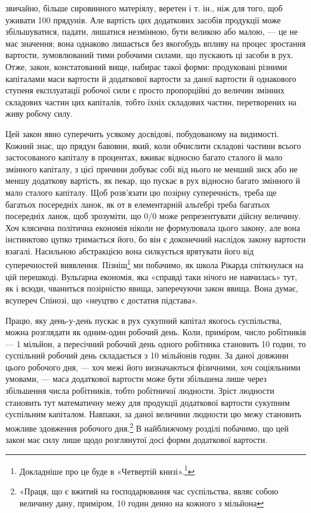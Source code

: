 \parcont{}  %
звичайно, більше сировинного матеріялу, веретен і т. ін., ніж
для того, щоб уживати 100 прядунів. Але вартість цих додаткових
засобів продукції може збільшуватися, падати, лишатися незмінною,
бути великою або малою, — це не має значення; вона однаково
лишається без якогобудь впливу на процес зростання вартости,
зумовлюваний тими робочими силами, що пускають ці
засоби в рух. Отже, закон, констатований вище, набирає такої
форми: продуковані різними капіталами маси вартости й додаткової
вартости за даної вартости й однакового ступеня експлуатації
робочої сили є просто пропорційні до величин змінних складових
частин цих капіталів, тобто їхніх складових частин, перетворених
на живу робочу силу.

Цей закон явно суперечить усякому досвідові, побудованому
на видимості. Кожний знає, що прядун бавовни, який, коли
обчислити складові частини всього застосованого капіталу в процентах,
вживає відносно багато сталого й мало змінного капіталу,
з цієї причини добуває собі від нього не менший зиск або не меншу
додаткову вартість, як пекар, що пускає в рух відносно багато
змінного й мало сталого капіталу. Щоб розв’язати цю позірну
суперечність, треба ще багатьох посередніх ланок, як от в елементарній
альґебрі треба багатьох посередніх ланок, щоб зрозуміти,
що 0/0 може репрезентувати дійсну величину. Хоч клясична політична
економія ніколи не формулювала цього закону, але вона
інстинктово цупко тримається його, бо він є доконечний наслідок
закону вартости взагалі. Насильною абстракцією вона силкується
врятувати його від суперечностей виявлення. Пізніш\footnote{
Докладніше про це буде в «Четвертій книзі».\footnote*{
Мова йде про «Теорії додаткової вартости», що їх Маркс мав на
думці видати як «Четверту книгу Капіталу». Ред.
}
}
ми побачимо, як школа Рікарда спіткнулася на цій перешкоді.
Вульґарна економія, яка «справді таки нічого не навчилась»
тут, як і всюди, чваниться позірністю явища, заперечуючи закон
явища. Вона думає, всупереч Спінозі, що «неуцтво є достатня
підстава».

Працю, яку день-у-день пускає в рух сукупний капітал
якогось суспільства, можна розглядати як одним-один робочий
день. Коли, приміром, число робітників — 1 мільйон, а пересічний
робочий день одного робітника становить 10 годин, то суспільний
робочий день складається з 10 мільйонів годин. За даної
довжини цього робочого дня, — хоч межі його визначаються фізичними,
хоч соціяльними умовами, — маса додаткової вартости може
бути збільшена лише через збільшення числа робітників, тобто
робітничої людности. Зріст людности становить тут математичну
межу для продукції додаткової вартости сукупним суспільним
капіталом. Навпаки, за даної величини людности цю межу становить
можливе здовження робочого дня.\footnote{
«Праця, що є вжитий на господарювання час суспільства, являє
собою величину дану, приміром, 10 годин денно на кожного з мільйона
} В найближчому розділі
побачимо, що цей закон має силу лише щодо розглянутої досі
форми додаткової вартости.


